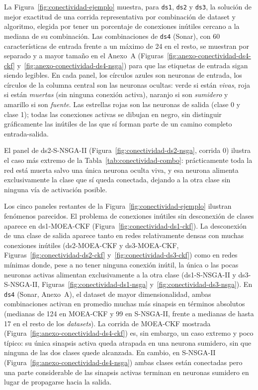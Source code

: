 La Figura~\ref{fig:conectividad-ejemplo} muestra, para \texttt{ds1}, \texttt{ds2} y \texttt{ds3}, la solución de mejor exactitud de una corrida representativa por combinación de dataset y algoritmo, elegida por tener un porcentaje de conexiones inútiles cercano a la mediana de su combinación. Las combinaciones de \texttt{ds4} (Sonar), con 60 características de entrada frente a un máximo de 24 en el resto, se muestran por separado y a mayor tamaño en el Anexo~A (Figuras~\ref{fig:anexo-conectividad-ds4-ckf} y~\ref{fig:anexo-conectividad-ds4-nsga}) para que las etiquetas de entrada sigan siendo legibles. En cada panel, los círculos azules son neuronas de entrada, los círculos de la columna central son las neuronas ocultas: verde si están \emph{vivas}, roja si están \emph{muertas} (sin ninguna conexión activa), naranjo si son \emph{sumidero} y amarillo si son \emph{fuente}. Las estrellas rojas son las neuronas de salida (clase 0 y clase 1); todas las conexiones activas se dibujan en negro, sin distinguir gráficamente las inútiles de las que sí forman parte de un camino completo entrada-salida.

El panel de ds2-S-NSGA-II (Figura~\ref{fig:conectividad-ds2-nsga}, corrida 0) ilustra el caso más extremo de la Tabla~\ref{tab:conectividad-combo}: prácticamente toda la red está muerta salvo una única neurona oculta viva, y esa neurona alimenta exclusivamente la clase que sí queda conectada, dejando a la otra clase sin ninguna vía de activación posible.

Los cinco paneles restantes de la Figura~\ref{fig:conectividad-ejemplo} ilustran fenómenos parecidos. El problema de conexiones inútiles sin desconexión de clases aparece en ds1-MOEA-CKF (Figura~\ref{fig:conectividad-ds1-ckf}). La desconexión de una clase de salida aparece tanto en redes relativamente densas con muchas conexiones inútiles (ds2-MOEA-CKF y ds3-MOEA-CKF, Figuras~\ref{fig:conectividad-ds2-ckf} y~\ref{fig:conectividad-ds3-ckf}) como en redes mínimas donde, pese a no tener ninguna conexión inútil, la única o las pocas neuronas activas alimentan exclusivamente a la otra clase (ds1-S-NSGA-II y ds3-S-NSGA-II, Figuras~\ref{fig:conectividad-ds1-nsga} y~\ref{fig:conectividad-ds3-nsga}). En \texttt{ds4} (Sonar, Anexo~A), el dataset de mayor dimensionalidad, ambas combinaciones activan en promedio muchas más sinapsis en términos absolutos (medianas de 124 en MOEA-CKF y 99 en S-NSGA-II, frente a medianas de hasta 17 en el resto de los \textit{datasets}). La corrida de MOEA-CKF mostrada (Figura~\ref{fig:anexo-conectividad-ds4-ckf}) es, sin embargo, un caso extremo y poco típico: su única sinapsis activa queda atrapada en una neurona sumidero, sin que ninguna de las dos clases quede alcanzada. En cambio, en S-NSGA-II (Figura~\ref{fig:anexo-conectividad-ds4-nsga}) ambas clases están conectadas pero una parte considerable de las sinapsis activas terminan en neuronas sumidero en lugar de propagarse hacia la salida.

